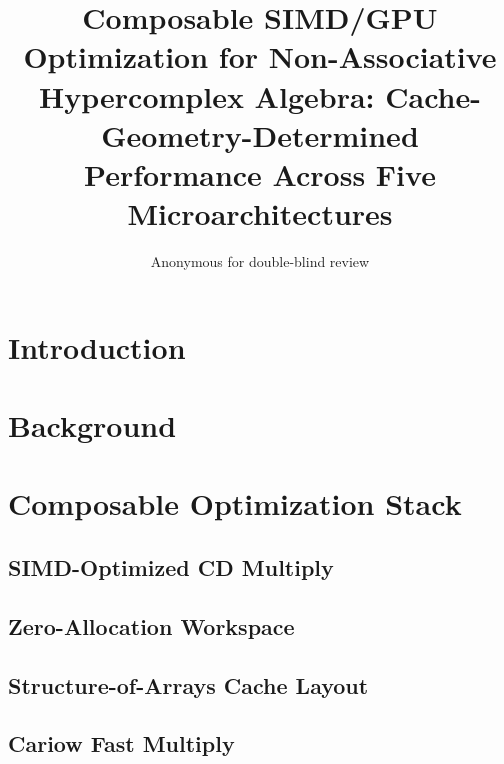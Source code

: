 \documentclass[sigconf,10pt,anonymous]{acmart}
\title{Composable SIMD/GPU Optimization for Non-Associative\\
Hypercomplex Algebra: Cache-Geometry-Determined\\
Performance Across Five Microarchitectures}
\author{Anonymous for double-blind review}
\begin{document}
\begin{abstract}

\end{abstract}

\maketitle

\section{Introduction}
\label{sec:intro}


\section{Background}
\label{sec:background}


\section{Composable Optimization Stack}
\label{sec:stack}

\subsection{SIMD-Optimized CD Multiply}

\subsection{Zero-Allocation Workspace}

\subsection{Structure-of-Arrays Cache Layout}

\subsection{Cariow Fast Multiply}
\end{document}

